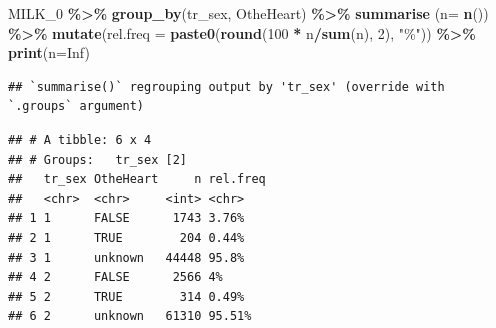 \documentclass[
]{article}
\newenvironment{Shaded}{\begin{snugshade}}{\end{snugshade}}
\newcommand{\DataTypeTok}[1]{\textcolor[rgb]{0.13,0.29,0.53}{#1}}
\newcommand{\DecValTok}[1]{\textcolor[rgb]{0.00,0.00,0.81}{#1}}
\newcommand{\KeywordTok}[1]{\textcolor[rgb]{0.13,0.29,0.53}{\textbf{#1}}}
\newcommand{\NormalTok}[1]{#1}
\newcommand{\OperatorTok}[1]{\textcolor[rgb]{0.81,0.36,0.00}{\textbf{#1}}}
\newcommand{\OtherTok}[1]{\textcolor[rgb]{0.56,0.35,0.01}{#1}}
\newcommand{\StringTok}[1]{\textcolor[rgb]{0.31,0.60,0.02}{#1}}
\begin{document}
\begin{Shaded}
\begin{Highlighting}[]
\NormalTok{MILK\_}\DecValTok{0} \OperatorTok{\%\textgreater{}\%}\StringTok{ }
\StringTok{  }\KeywordTok{group\_by}\NormalTok{(tr\_sex, OtheHeart) }\OperatorTok{\%\textgreater{}\%}\StringTok{ }
\StringTok{  }\KeywordTok{summarise}\NormalTok{ (}\DataTypeTok{n=} \KeywordTok{n}\NormalTok{()) }\OperatorTok{\%\textgreater{}\%}
\StringTok{  }\KeywordTok{mutate}\NormalTok{(}\DataTypeTok{rel.freq =} \KeywordTok{paste0}\NormalTok{(}\KeywordTok{round}\NormalTok{(}\DecValTok{100} \OperatorTok{*}\StringTok{ }\NormalTok{n}\OperatorTok{/}\KeywordTok{sum}\NormalTok{(n), }\DecValTok{2}\NormalTok{), }\StringTok{"\%"}\NormalTok{))  }\OperatorTok{\%\textgreater{}\%}\StringTok{ }
\StringTok{  }\KeywordTok{print}\NormalTok{(}\DataTypeTok{n=}\OtherTok{Inf}\NormalTok{)}
\end{Highlighting}
\end{Shaded}

\begin{verbatim}
## `summarise()` regrouping output by 'tr_sex' (override with `.groups` argument)
\end{verbatim}

\begin{verbatim}
## # A tibble: 6 x 4
## # Groups:   tr_sex [2]
##   tr_sex OtheHeart     n rel.freq
##   <chr>  <chr>     <int> <chr>   
## 1 1      FALSE      1743 3.76%   
## 2 1      TRUE        204 0.44%   
## 3 1      unknown   44448 95.8%   
## 4 2      FALSE      2566 4%      
## 5 2      TRUE        314 0.49%   
## 6 2      unknown   61310 95.51%
\end{verbatim}
\end{document}
